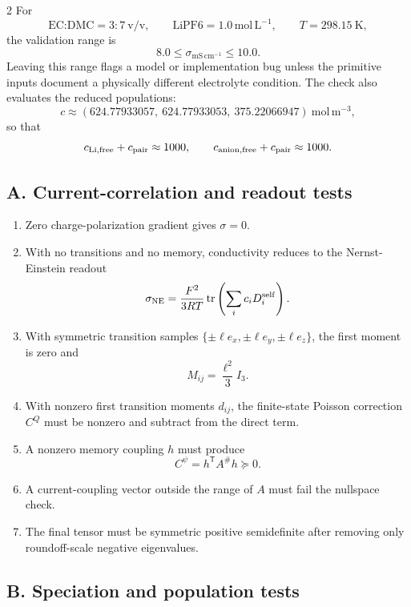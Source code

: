 \documentclass[10pt]{article}
\newcommand{\T}{\mathsf{T}}
\newcommand{\tr}{\operatorname{tr}}
\newcommand{\molL}{\mathrm{mol\,L^{-1}}}
\newcommand{\molm}{\mathrm{mol\,m^{-3}}}
\newcommand{\mScm}{\mathrm{mS\,cm^{-1}}}
\begin{document}
\begin{multicols}{2}
For
\[
\text{EC:DMC}=3:7\ \mathrm{v/v},
\qquad
\text{LiPF6}=1.0\,\molL,
\qquad
T=298.15\ \mathrm K,
\]
the validation range is
\[
8.0 \le \sigma_{\mScm}\le 10.0.
\]
Leaving this range flags a model or implementation bug unless the primitive
inputs document a physically different electrolyte condition. The check also
evaluates the reduced populations:
\[
c \approx
(624.77933057,\ 624.77933053,\ 375.22066947)\ \molm,
\]
so that
\[
c_{\rm Li,free}+c_{\rm pair}\approx1000,
\qquad
c_{\rm anion,free}+c_{\rm pair}\approx1000.
\]

\subsection{A. Current-correlation and readout tests}

\begin{enumerate}
\item Zero charge-polarization gradient gives \(\sigma=0\).
\item With no transitions and no memory, conductivity reduces to the
Nernst-Einstein readout
\[
\sigma_{\rm NE}
=
\frac{F^2}{3RT}\tr\left(\sum_i c_iD_i^{\rm self}\right).
\]
\item With symmetric transition samples
\(\{\pm \ell e_x,\pm \ell e_y,\pm \ell e_z\}\), the first moment is zero and
\[
M_{ij}=\frac{\ell^2}{3}I_3.
\]
\item With nonzero first transition moments \(d_{ij}\), the finite-state Poisson
correction \(C^Q\) must be nonzero and subtract from the direct term.
\item A nonzero memory coupling \(h\) must produce
\[
C^\psi=h^{\T}A^\#h\succeq0.
\]
\item A current-coupling vector outside the range of \(A\) must fail the
nullspace check.
\item The final tensor must be symmetric positive semidefinite after removing
only roundoff-scale negative eigenvalues.
\end{enumerate}

\subsection{B. Speciation and population tests}


\end{multicols}
\end{document}

